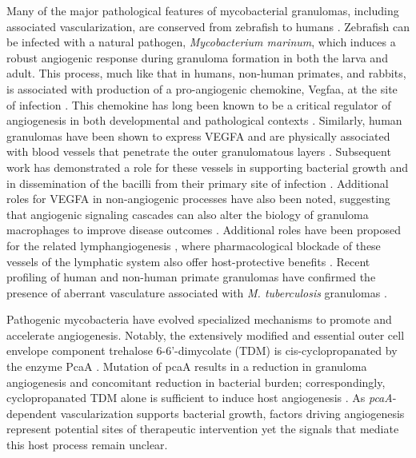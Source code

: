 Many of the major pathological features of mycobacterial granulomas, including associated vascularization, are conserved from zebrafish to humans \citep{Swaim2006, Bohrer2021}. Zebrafish can be infected with a natural pathogen, \textit{Mycobacterium marinum}, which induces a robust angiogenic response during granuloma formation in both the larva and adult. This process, much like that in humans, non-human primates, and rabbits, is associated with production of a pro-angiogenic chemokine, Vegfaa, at the site of infection \citep{Oehlers2015}. This chemokine has long been known to be a critical regulator of angiogenesis in both developmental and pathological contexts \citep{Chung2011, Leung1989, Adams2007}. Similarly, human granulomas have been shown to express VEGFA and are physically associated with blood vessels that penetrate the outer granulomatous layers \citep{Datta2015}. Subsequent work has demonstrated a role for these vessels in supporting bacterial growth and in dissemination of the bacilli from their primary site of infection \citep{Polena2016}. Additional roles for VEGFA in non-angiogenic processes have also been noted, suggesting that angiogenic signaling cascades can also alter the biology of granuloma macrophages to improve disease outcomes \citep{Harding2019}. Additional roles have been proposed for the related lymphangiogenesis \citep{Alitalo2005, Duong2012, Lerner2020}, where pharmacological blockade of these vessels of the lymphatic system also offer host-protective benefits \citep{Harding2015}. Recent profiling of human and non-human primate granulomas have confirmed the presence of aberrant vasculature associated with \textit{M. tuberculosis} granulomas \citep{Gideon2022, McCaffrey2022, Cronan2021}.

Pathogenic mycobacteria have evolved specialized mechanisms to promote and accelerate angiogenesis. Notably, the extensively modified and essential outer cell envelope component trehalose 6-6'-dimycolate (TDM) is cis-cyclopropanated by the enzyme PcaA \citep{Glickman2000, Rao2005}. Mutation of pcaA results in a reduction in granuloma angiogenesis and concomitant reduction in bacterial burden; correspondingly, cyclopropanated TDM alone is sufficient to induce host angiogenesis \citep{Saita2000, Sakaguchi2000, Walton2018}. As \textit{pcaA}-dependent vascularization supports bacterial growth, factors driving angiogenesis represent potential sites of therapeutic intervention yet the signals that mediate this host process remain unclear.

